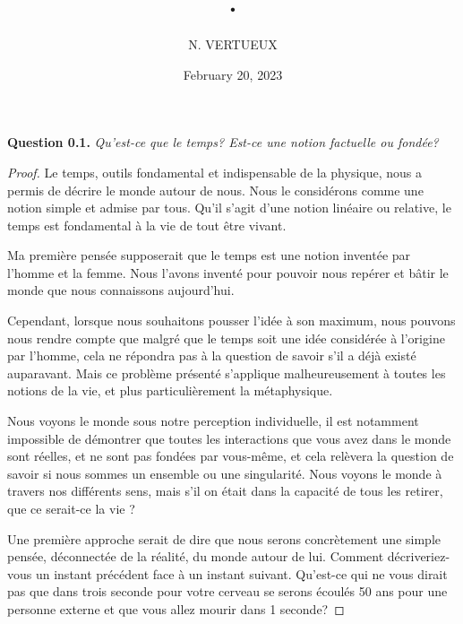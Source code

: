 \documentclass{Tools}
\begin{document}
\title[]{.}

\author{N. VERTUEUX}

\date{February 20, 2023}

\dedicatory{}

\begin{abstract}
\end{abstract}

\maketitle

\textbf{Question 0.1.} \emph{Qu'est-ce que le temps? Est-ce une notion factuelle ou fondée?}\\ 

\begin{proof}
Le temps, outils fondamental et indispensable de la physique, nous a permis de décrire le monde autour de nous. Nous le considérons comme une notion
simple et admise par tous. Qu'il s'agit d'une notion linéaire ou relative, le temps est fondamental à la vie de tout être vivant.

Ma première pensée supposerait que le temps est une notion inventée par l'homme et la femme. Nous l'avons inventé pour pouvoir nous repérer et bâtir le 
monde que nous connaissons aujourd'hui.

Cependant, lorsque nous souhaitons pousser l'idée à son maximum, nous pouvons nous rendre compte que malgré que le temps soit une idée considérée à l'origine par l'homme, cela ne répondra pas à la question de savoir s'il a déjà existé auparavant. Mais ce problème présenté s'applique malheureusement à toutes les notions de la vie, et plus particulièrement la métaphysique. 

Nous voyons le monde sous notre perception individuelle, il est notamment impossible de démontrer que toutes les interactions que vous avez dans le monde sont réelles, et ne sont pas fondées par vous-même, et cela relèvera la question de savoir si nous sommes un ensemble ou une singularité. Nous voyons le monde à travers nos différents sens, mais s'il on était dans la capacité de tous les retirer, que ce serait-ce la vie ?

Une première approche serait de dire que nous serons concrètement une simple pensée, déconnectée de la réalité, du monde autour de lui. Comment décriveriez-vous un instant précédent face à un instant suivant. Qu'est-ce qui ne vous dirait pas que dans trois seconde pour votre cerveau se serons écoulés 50 ans pour une personne externe et que vous allez mourir dans 1 seconde? 


\end{proof}
\end{document}
